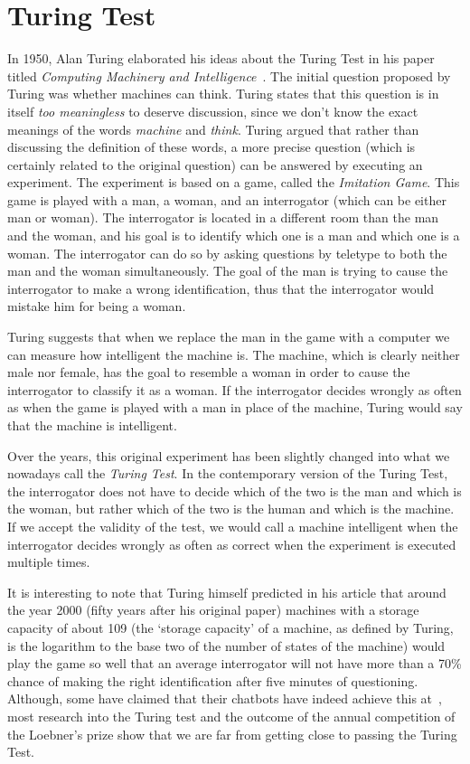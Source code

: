 \section{Turing Test}
In 1950, Alan Turing elaborated his ideas about the Turing Test in his paper titled \textit{Computing Machinery and Intelligence}~\cite{turing1950computing}. The initial question proposed by Turing was whether machines can think. Turing states that this question is in itself \textit{too meaningless} to deserve discussion, since we don't know the exact meanings of the words \textit{machine} and \textit{think}. Turing argued that rather than discussing the definition of these words, a more precise question (which is certainly related to the original question) can be answered by executing an experiment. The experiment is based on a game, called the \textit{Imitation Game}. This game is played with a man, a woman, and an interrogator (which can be either man or woman). The interrogator is located in a different room than the man and the woman, and his goal is to identify which one is a man and which one is a woman. The interrogator can do so by asking questions by teletype to both the man and the woman simultaneously. The goal of the man is trying to cause the interrogator to make a wrong identification, thus that the interrogator would mistake him for being a woman.

Turing suggests that when we replace the man in the game with a computer we can measure how intelligent the machine is. The machine, which is clearly neither male nor female, has the goal to resemble a woman in order to cause the interrogator to classify it as a woman. If the interrogator decides wrongly as often as when the game is played with a man in place of the machine, Turing would say that the machine is intelligent.

Over the years, this original experiment has been slightly changed into what we nowadays call the \textit{Turing Test}. In the contemporary version of the Turing Test, the interrogator does not have to decide which of the two is the man and which is the woman, but rather which of the two is the human and which is the machine. If we accept the validity of the test, we would call a machine intelligent when the interrogator decides wrongly as often as correct when the experiment is executed multiple times.

It is interesting to note that Turing himself predicted in his article that around the year 2000 (fifty years after his original paper) machines with a storage capacity of about 109 (the ‘storage capacity’ of a machine, as defined by Turing, is the logarithm to the base two of the number of states of the machine) would play the game so well that an average interrogator will not have more than a 70\% chance of making the right identification after five minutes of questioning. Although, some have claimed that their chatbots have indeed achieve this at~\cite{copeland2014eugene}, most research into the Turing test and the outcome of the annual competition of the Loebner's prize show that we are far from getting close to passing the Turing Test.
